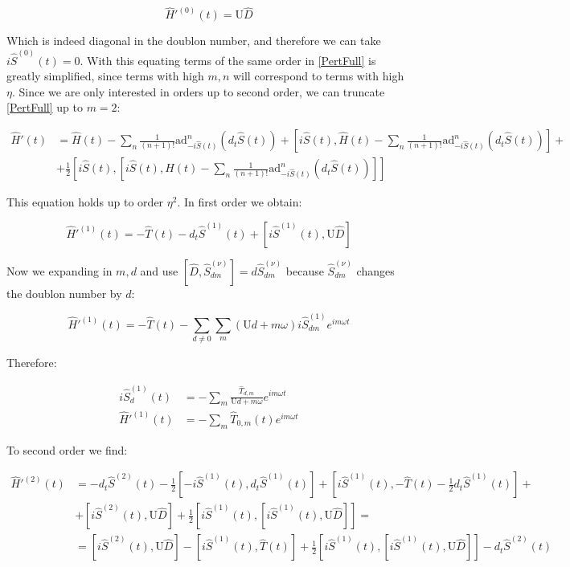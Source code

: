 \begin{equation}
\hat{H}'^{(0)}(t) = \text{U}\hat{D}
\end{equation}

Which is indeed diagonal in the doublon number, and therefore we can take $i\hat{S}^{(0)}(t)=0$. With this equating terms of the same order in \ref{PertFull} is greatly simplified, since terms with high $m,n$ will correspond to terms with high $\eta$. Since we are only interested in orders up to second order, we can truncate \ref{PertFull} up to $m=2$:

\begin{align}
\label{PertTrunc}
\hat{H}'(t) &=  \hat{H}(t) - \sum_n \frac{1}{(n+1)!}\text{ad}_{-i\hat{S}(t)}^n (d_t \hat{S}(t)) + [i\hat{S}(t), \hat{H}(t) - \sum_n \frac{1}{(n+1)!}\text{ad}_{-i\hat{S}(t)}^n (d_t \hat{S}(t))] + \nonumber \\
&+ \frac{1}{2} [i\hat{S}(t),[i\hat{S}(t), \hat{H}(t) - \sum_n \frac{1}{(n+1)!}\text{ad}_{-i\hat{S}(t)}^n (d_t \hat{S}(t)) ]]
\end{align}

This equation holds up to order $\eta^2$. In first order we obtain:

\begin{equation}
\label{1stO}
\hat{H}'^{(1)}(t) = -\hat{T}(t) - d_t\hat{S}^{(1)}(t) + \left[ i\hat{S}^{(1)}(t), \text{U}\hat{D} \right]
\end{equation}

Now we expanding in $m,d$ and use $\left[ \hat{D}, \hat{S}^{(\nu)}_{dm} \right] = d\hat{S}^{(\nu)}_{dm}$ because $\hat{S}^{(\nu)}_{dm}$ changes the doublon number by $d$:

\begin{equation}
\hat{H}'^{(1)}(t)=-\hat{T}(t)-\sum_{d\neq 0}\sum_m (\text{U}d+m\omega) i\hat{S}^{(1)}_{dm} e^{im\omega t}
\end{equation}

Therefore:

\begin{align}
i\hat{S}^{(1)}_d(t) &= -\sum_m \frac{\hat{T}_{d,m}}{\text{U}d+m\omega}e^{im\omega t} \label{1stOSpin}\\
\hat{H}'^{(1)}(t) &= -\sum_m \hat{T}_{0,m}(t)e^{im\omega t} \label{1stOH}
\end{align}

To second order we find:

\begin{align}
\hat{H}'^{(2)}(t) &= - d_t\hat{S}^{(2)}(t) - \frac{1}{2}\left[-i\hat{S}^{(1)}(t), d_t\hat{S}^{(1)}(t) \right] + \left[i\hat{S}^{(1)}(t), -\hat{T}(t)-\frac{1}{2}d_t\hat{S}^{(1)}(t) \right] +\nonumber \\
&+ \left[i\hat{S}^{(2)}(t), \text{U}\hat{D} \right] + \frac{1}{2} \left[i\hat{S}^{(1)}(t), \left[i\hat{S}^{(1)}(t), \text{U}\hat{D} \right] \right] = \nonumber \\
&= \left[i\hat{S}^{(2)}(t), \text{U} \hat{D} \right] - \left[ i\hat{S}^{(1)}(t), \hat{T}(t) \right] + \frac{1}{2}\left[ i\hat{S}^{(1)}(t), \left[ i\hat{S}^{(1)}(t), \text{U}\hat{D} \right] \right] - d_t\hat{S}^{(2)}(t)
\end{align}

